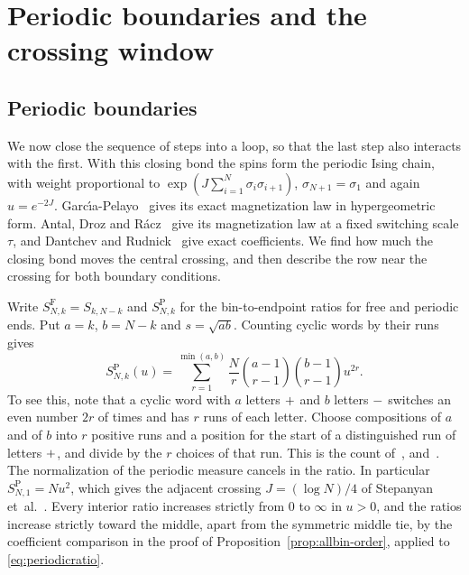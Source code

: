 \section{Periodic boundaries and the crossing window}\label{sec:periodicwindow}

\subsection{Periodic boundaries}\label{sec:periodic}

We now close the sequence of steps into a loop, so that the last step also
interacts with the first. With this closing bond the spins form the periodic
Ising chain, with weight proportional to
$\exp(J\sum_{i=1}^N\sigma_i\sigma_{i+1})$, $\sigma_{N+1}=\sigma_1$ and again
$u=e^{-2J}$. Garc\'{\i}a-Pelayo~\cite[Eq.~(15)]{garciapelayo2009} gives its exact
magnetization law in hypergeometric form. Antal, Droz and R\'acz~\cite{antal2004} give its magnetization law
at a fixed switching scale $\tau$, and Dantchev and Rudnick~\cite{dantchev2022} give exact
coefficients. We find how much the closing bond moves the central crossing,
and then describe the row near the crossing for both boundary conditions.

Write $S^{\mathrm F}_{N,k}=S_{k,N-k}$ and $S^{\mathrm P}_{N,k}$ for the
bin-to-endpoint ratios for free and periodic ends. Put $a=k$, $b=N-k$
and $s=\sqrt{ab}$. Counting cyclic words by their runs gives
\begin{equation}\label{eq:periodicratio}
S^{\mathrm P}_{N,k}(u)=\sum_{r=1}^{\min(a,b)}\frac Nr
 \binom{a-1}{r-1}\binom{b-1}{r-1}u^{2r}.
\end{equation}
To see this, note that a cyclic word with $a$ letters $\mathord{+}$ and $b$ letters
$\mathord{-}$ switches an even number $2r$ of times and has $r$ runs of each letter.
Choose compositions of $a$ and of $b$ into $r$ positive runs and a position for
the start of a distinguished run of letters $\mathord{+}$, and divide by the $r$ choices of
that run. This is the count of~\cite[Appendix~B, Eqs.~(B2') to~(B4)]{garciapelayo2009},
\cite[Eq.~(30)]{antal2004} and~\cite[Eq.~(2.9)]{dantchev2022}. The normalization of the periodic
measure cancels in the ratio. In
particular $S^{\mathrm P}_{N,1}=Nu^2$, which gives the adjacent crossing
$J=(\log N)/4$ of Stepanyan et~al.\@~\cite{stepanyan2024}. Every interior
ratio increases strictly from $0$ to $\infty$ in $u>0$, and the ratios
increase strictly toward the middle, apart from the symmetric middle tie, by
the coefficient comparison in the proof of Proposition~\ref{prop:allbin-order},
applied to \eqref{eq:periodicratio}.

